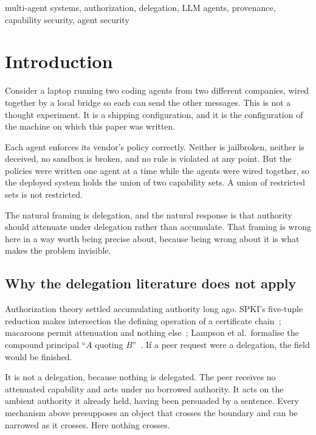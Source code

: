 \documentclass[conference]{IEEEtran}
\begin{document}
\begin{IEEEkeywords}
multi-agent systems, authorization, delegation, LLM agents, provenance,
capability security, agent security
\end{IEEEkeywords}

\section{Introduction}

Consider a laptop running two coding agents from two different companies, wired
together by a local bridge so each can send the other messages. This is not a
thought experiment. It is a shipping configuration, and it is the configuration
of the machine on which this paper was written.

Each agent enforces its vendor's policy correctly. Neither is jailbroken,
neither is deceived, no sandbox is broken, and no rule is violated at any point.
But the policies were written one agent at a time while the agents were wired
together, so the deployed system holds the union of two capability sets. A union
of restricted sets is not restricted.

The natural framing is delegation, and the natural response is that authority
should attenuate under delegation rather than accumulate. That framing is wrong
here in a way worth being precise about, because being wrong about it is what
makes the problem invisible.

\subsection{Why the delegation literature does not apply}

Authorization theory settled accumulating authority long ago. SPKI's five-tuple
reduction makes intersection the defining operation of a certificate
chain~\cite{spki}; macaroons permit attenuation and nothing
else~\cite{macaroons}; Lampson et al.\ formalise the compound principal
``$A$ quoting $B$''~\cite{ablp1992}. If a peer request were a delegation, the
field would be finished.

It is not a delegation, because nothing is delegated. The peer receives no
attenuated capability and acts under no borrowed authority. It acts on the
ambient authority it already held, having been persuaded by a sentence. Every
mechanism above presupposes an object that crosses the boundary and can be
narrowed as it crosses. Here nothing crosses.
\end{document}
